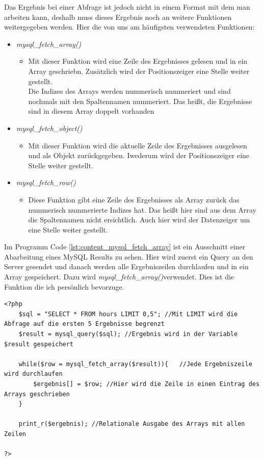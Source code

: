 Das Ergebnis bei einer Abfrage ist jedoch nicht in einem Format mit dem man arbeiten kann, deshalb muss dieses Ergebnis noch an weitere Funktionen weitergegeben werden. Hier die von uns am häufigsten verwendeten Funktionen:
\begin{itemize}
	\item \textit{mysql\_fetch\_array()}
	\begin{itemize}
		\item Mit dieser Funktion wird eine Zeile des Ergebnisses gelesen und in ein Array geschriebn. Zusätzlich wird der Positionszeiger eine Stelle weiter gestellt.\\
		Die Indizes des Arrays werden nummerisch nummeriert und sind nochmals mit den Spaltennamen nummeriert. Das heißt, die Ergebnisse sind in diesem Array doppelt vorhanden 
	\end{itemize}
	\item \textit{mysql\_fetch\_object()}
		\begin{itemize}
			\item Mit dieser Funktion wird die aktuelle Zeile des Ergebnisses ausgelesen und als Objekt zurückgegeben. Iwederum wird der Positionszeiger eine Stelle weiter gestellt.
		\end{itemize}
	\item \textit{mysql\_fetch\_row()}
		\begin{itemize}
			\item Diese Funktion gibt eine Zeile des Ergebnisses als Array zurück das nummerisch nummerierte Indizes hat. Das heißt hier sind aus dem Array die Spaltennamen nicht ersichtlich. Auch hier wird der Datenzeiger um eine Stelle weiter gestellt.
		\end{itemize}
\end{itemize}
Im Programm Code \ref{lst:content_mysql_fetch_array} ist ein Ausschnitt einer Abarbeitung eines MySQL Results zu sehen. Hier wird zuerst ein Query an den Server gesendet und danach werden alle Ergebniszeilen durchlaufen und in ein Array gespeichert. Dazu wird \textit{mysql\_fetch\_array()}verwendet. Dies ist die Funktion die ich persönlich bevorzuge.\\
\begin{lstlisting}[style=customPHP, caption={MySQL Query weiterverarbeiten},label={lst:content_mysql_fetch_array}]
<?php 
	$sql = "SELECT * FROM hours LIMIT 0,5"; //Mit LIMIT wird die Abfrage auf die ersten 5 Ergebnisse begrenzt
	$result = mysql_query($sql); //Ergebnis wird in der Variable $result gespeichert
	
	while($row = mysql_fetch_array($result)){	//Jede Ergebniszeile wird durchlaufen
		$ergebnis[] = $row;	//Hier wird die Zeile in einen Eintrag des Arrays geschrieben
	}
	
	print_r($ergebnis);	//Relationale Ausgabe des Arrays mit allen Zeilen
	
?>
\end{lstlisting}
